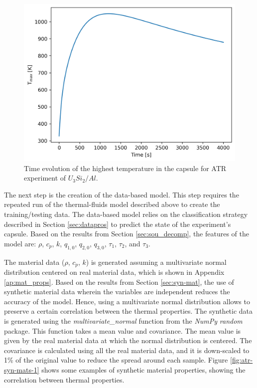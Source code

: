 \begin{figure}[htbp!] %
    \centering
    \includegraphics[width=0.45\linewidth]{figures/atr-U3Si2Al}
    \hfill
    \caption{Time evolution of the highest temperature in the capsule for ATR experiment of $U_3Si_2/Al$.}
    \label{fig:atr-u3si2al}
\end{figure}

The next step is the creation of the data-based model.
This step requires the repeated run of the thermal-fluids model described above to create the training/testing data.
The data-based model relies on the classification strategy described in Section \ref{sec:datapros} to predict the state of the experiment's capsule.
Based on the results from Section \ref{sec:sou_decomp}, the features of the model are: $\rho$, $c_p$, $k$, $q_{1,0}$, $q_{2,0}$, $q_{3,0}$, $\tau_1$, $\tau_2$, and $\tau_3$.

The material data ($\rho$, $c_p$, $k$) is generated assuming a multivariate normal distribution centered on real material data, which is shown in Appendix \ref{ap:mat_props}.
Based on the results from Section \ref{sec:syn-mat}, the use of synthetic material data wherein the variables are independent reduces the accuracy of the model.
Hence, using a multivariate normal distribution allows to preserve a certain correlation between the thermal properties.
The synthetic data is generated using the \textit{multivariate\_normal} function from the \textit{NumPy} \textit{random} package.
This function takes a mean value and covariance.
The mean value is given by the real material data at which the normal distribution is centered.
The covariance is calculated using all the real material data, and it is down-scaled to 1\% of the original value to reduce the spread around each sample.
Figure \ref{fig:atr-syn-mats-1} shows some examples of synthetic material properties, showing the correlation between thermal properties.

